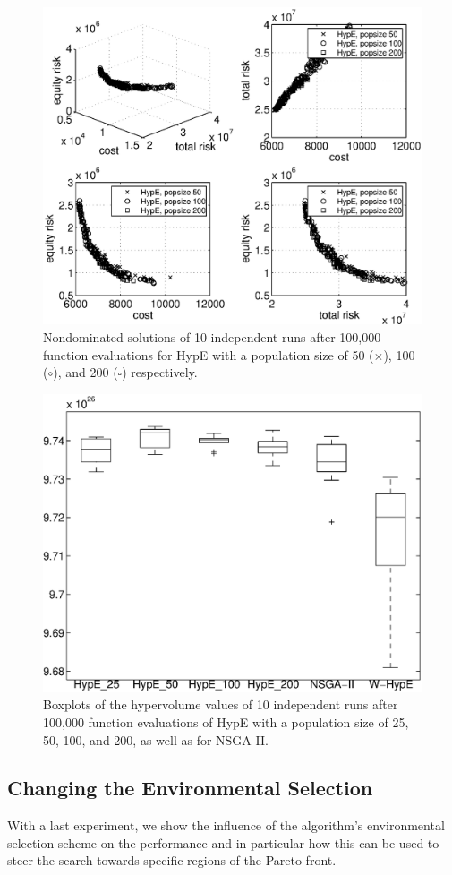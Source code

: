 \documentclass[preprint,12pt]{elsarticle}
\begin{document}
\begin{figure}%
	\centering
	\includegraphics[width=0.75\columnwidth]{../experiments/randVsCost/diffPopsizes}%
	\vspace{-1em}
	\caption{\label{fig:popsizes} Nondominated solutions of 10 independent runs after 100,000 function evaluations for HypE with a population size of 50 ($\times$), 100 ($\circ$), and 200 ($\square$) respectively.}
\end{figure}

\begin{figure}%
	\centering
	\includegraphics[width=0.5\columnwidth]{../experiments/randVsCost/hypervolumes/algoComparison}%
	\caption{\label{fig:algoComparison} Boxplots of the hypervolume values of 10 independent runs after 100,000 function evaluations of HypE with a population size of 25, 50, 100, and 200, as well as for NSGA-II.}
\end{figure}

\subsection{Changing the Environmental Selection}
With a last experiment, we show the influence of the algorithm's environmental selection scheme on the performance and in particular how this can be used to steer the search towards specific regions of the Pareto front.
\end{document}
